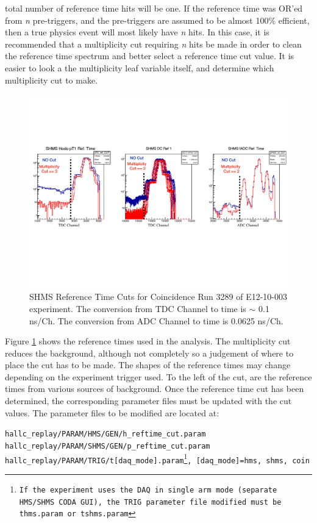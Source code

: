 \documentclass[14pt]{article}
\begin{document}
total number of reference time hits will be one. If the reference time was OR'ed from \textit{n} pre-triggers, and the pre-triggers are assumed to be
almost 100\% efficient, then a true physics event will most likely have \textit{n} hits. In this case, it is recommended that a multiplicity cut requiring
\textit{n} hits be made in order to clean the reference time spectrum and better select a reference time cut value. It is easier to look a the multiplicity
leaf variable itself, and determine which multiplicity cut to make.
\begin{figure}[H]
  \captionsetup{justification=raggedright,singlelinecheck=false}
  \includegraphics[scale=0.5]{plots/shms_ref_times.pdf}
  \caption{SHMS Reference Time Cuts for Coincidence Run 3289 of E12-10-003 experiment. The conversion from TDC Channel to time is $\sim$ 0.1 ns/Ch. The conversion from ADC Channel to time is 0.0625 ns/Ch. }
  \label{fig:shms_ref_times}
\end{figure}
Figure \ref{fig:shms_ref_times} shows the reference times used in the analysis. The
multiplicity cut reduces the background, although not completely so a judgement of where to place the cut has to be made. The shapes of the reference times may change
depending on the experiment trigger used. To the left of the cut, are the reference times from various sources of background. 
Once the reference time cut has been determined, the corresponding parameter files must be updated with the cut values. The parameter files to be modified are
located at: 
\begin{flushleft}
  \texttt{hallc\_replay/PARAM/HMS/GEN/h\_reftime\_cut.param} \\
  \texttt{hallc\_replay/PARAM/SHMS/GEN/p\_reftime\_cut.param} \\
  \texttt{hallc\_replay/PARAM/TRIG/t[daq\_mode].param\footnote{If the experiment uses the DAQ in single arm mode (separate HMS/SHMS CODA GUI), the \texttt{TRIG} parameter file
    modified must be \texttt{thms.param} or \texttt{tshms.param}},  [daq\_mode]=hms, shms, coin} 
\end{flushleft}
\end{document}
